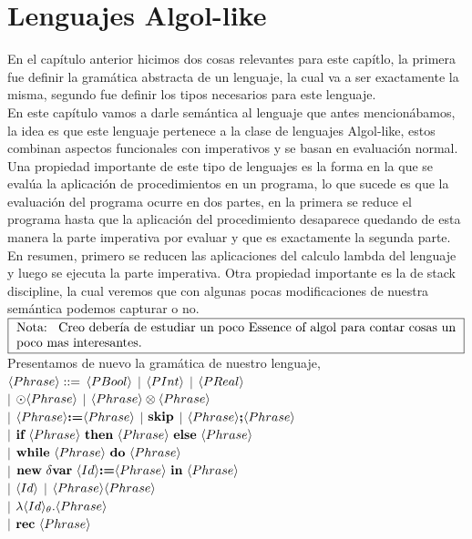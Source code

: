 \chapter{Lenguajes Algol-like}
\label{chap:algollike}

En el cap\'itulo anterior hicimos dos cosas relevantes 
para este cap\'itlo, la primera fue definir la gram\'atica
abstracta de un lenguaje, la cual va a ser exactamente la
misma, segundo fue definir los tipos necesarios para este 
lenguaje. \\

En este cap\'itulo vamos a darle sem\'antica al lenguaje
que antes mencion\'abamos, la idea es que este lenguaje 
pertenece a la clase de lenguajes Algol-like, estos combinan
aspectos funcionales con imperativos y se basan en evaluaci\'on
normal. Una propiedad importante de este tipo de lenguajes es
la forma en la que se eval\'ua la aplicaci\'on de procedimientos
en un programa, lo que sucede es que la evaluaci\'on del programa
ocurre en dos partes, en la primera se reduce el programa hasta que
la aplicaci\'on del procedimiento desaparece quedando de esta manera 
la parte imperativa por evaluar y que es exactamente la segunda parte.
En resumen, primero se reducen las aplicaciones del calculo lambda
del lenguaje y luego se ejecuta la parte imperativa. Otra propiedad 
importante es la de stack discipline, la cual veremos que con 
algunas pocas modificaciones de nuestra sem\'antica podemos capturar
o no.\\

\noindent
$\note{ Creo deber\'ia de estudiar un poco Essence of algol para contar
cosas un poco mas interesantes.
 }$\\

Presentamos de nuevo la gram\'atica de nuestro lenguaje,\\

\noindent
$\langle Phrase \rangle ::=$ $\langle PBool \rangle$ $|$ $\langle PInt \rangle$ $|$ $\langle PReal \rangle$ \\
\indent \indent \indent $|$ 
$\odot \langle Phrase \rangle$ $|$ $\langle Phrase \rangle \otimes \langle Phrase \rangle $ \\ 
\indent \indent \indent $|$ 
$\langle Phrase \rangle \textbf{:=} \langle Phrase \rangle$ $|$ $\textbf{skip}$ $|$ $\langle Phrase \rangle \textbf{;} \langle Phrase \rangle$ \\ 
\indent \indent \indent $|$ 
$\textbf{if} \ \langle Phrase \rangle \ \textbf{then} \ \langle Phrase \rangle \ \textbf{else} \ \langle Phrase \rangle$ \\ 
\indent \indent \indent $|$ 
$\textbf{while} \ \langle Phrase \rangle \ \textbf{do} \ \langle Phrase \rangle$ \\ 
\indent \indent \indent $|$ 
$\textbf{new} \ \delta \textbf{var} \ \langle Id \rangle \textbf{:=} \langle Phrase \rangle \ \textbf{in} \ \langle Phrase \rangle$ \\ 
\indent \indent \indent $|$ 
$\langle Id \rangle$ $|$ $\langle Phrase \rangle\langle Phrase \rangle$ \\
\indent \indent \indent $|$ 
$\lambda \langle Id \rangle_{\theta} . \langle Phrase \rangle $ \\
\indent \indent \indent $|$ 
$\textbf{rec} \ \langle Phrase \rangle$
\\


